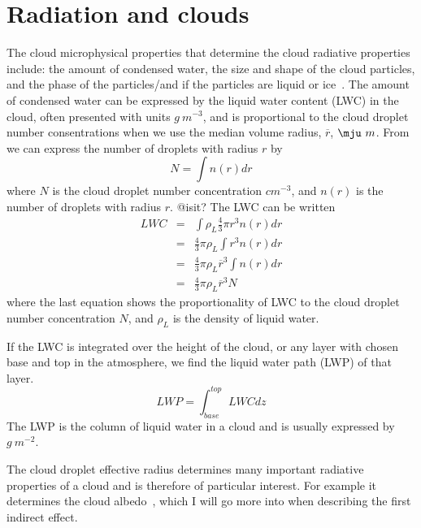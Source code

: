\section{Radiation and clouds}
The cloud microphysical properties that determine the cloud radiative properties include: the amount of condensed water, the size and shape of the cloud particles, and the phase of the particles/and if the particles are liquid or ice~\citep{Curry1996}. The amount of condensed water can be expressed by the liquid water content (LWC) in the cloud, often presented with units $g~m^{-3}$, and is proportional to the cloud droplet number consentrations when we use the median volume radius, $\overline{r}$, $\mju~m$. From~\cite{Rogers1989} we can express the number of droplets with radius $r$ by
\begin{equation}
N = \int n(r) dr
\end{equation}
where $N$ is the cloud droplet number concentration $cm^{-3}$, and $n(r)$ is the number of droplets with radius $r$. @isit?
The LWC can be written
\begin{eqnarray}
LWC &=& \int \rho_L \frac{4}{3} \pi r^3 n(r) dr\\
&=& \frac{4}{3} \pi \rho_L \int r^3 n(r) dr\\
&=& \frac{4}{3} \pi \rho_L \overline{r}^3 \int n(r) dr\\
&=& \frac{4}{3} \pi \rho_L \overline{r}^3 N 
\end{eqnarray}
where the last equation shows the proportionality of LWC to the cloud droplet number concentration $N$, and $\rho_L$ is the density of liquid water.

If the LWC is integrated over the height of the cloud, or any layer with chosen base and top in the atmosphere, we find the liquid water path (LWP) of that layer.
\begin{equation}
LWP = \int_{base}^{top} LWC dz
\end{equation}
The LWP is the column of liquid water in a cloud and is usually expressed by $g~m^{-2}$.


The cloud droplet effective radius determines many important radiative properties of a cloud and is therefore of particular interest. For example it determines the cloud albedo~\citep{Hansen1974}, which I will go more into when describing the first indirect effect.


